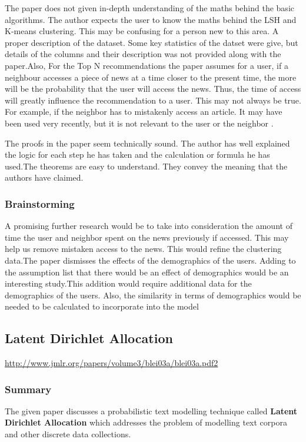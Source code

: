 \documentclass{article}
\begin{document}
The paper does not given in-depth understanding of the maths behind the basic algorithms. The author expects the user to know the maths behind the LSH and K-means clustering. This may be confusing for a person new to this area. A proper description of the dataset. Some key statistics of the datset were give, but details of the columns and their description was not provided along with the paper.Also, For the Top N recommendations the paper assumes for a user, if a neighbour accesses a piece of news at a time closer to the present time, the more will be the probability that the user will access the news. Thus, the time of access will greatly influence the recommendation to a user. This may not always be true. For example, if the neighbor has to mistakenly access an article. It may have been used very recently, but it is not relevant to the user or the neighbor .

The proofs in the paper seem technically sound. The author has well explained the logic for each step he has taken and the calculation or formula he has used.The theorems are easy to understand. They convey the meaning that the authors have claimed.

\subsubsection{Brainstorming}
A promising further research would be to take into consideration the amount of time the user and neighbor spent on the news previously if accessed. This may help us remove mistaken access to the news. This would refine the clustering data.The paper dismisses the effects of the demographics of the users. Adding to the assumption list that there would be an effect of demographics would be an interesting study.This addition would require additional data for the demographics of the users. Also, the similarity in terms of demographics would be needed to be calculated to incorporate into the model

\subsection{Latent Dirichlet Allocation}

\url{http://www.jmlr.org/papers/volume3/blei03a/blei03a.pdf2}

\subsubsection{Summary}
The given paper discusses a probabilistic text modelling technique called \textbf{Latent Dirichlet Allocation} which addresses the problem of modelling text corpora and other discrete data collections. 
\end{document}
